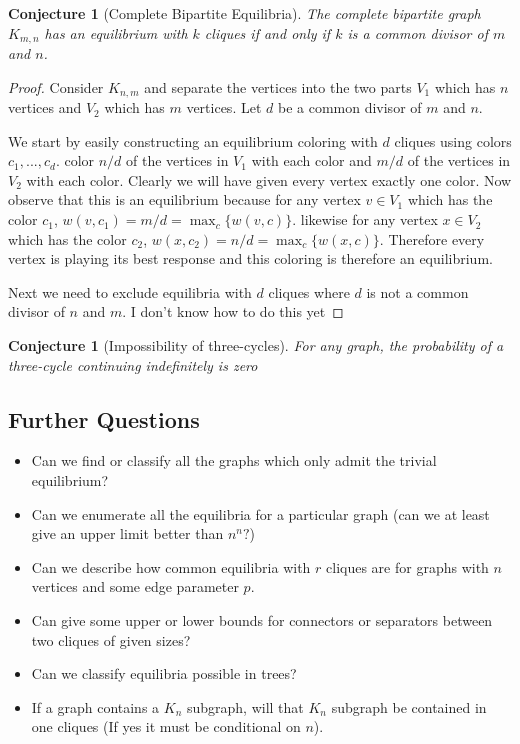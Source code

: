 \documentclass[]{article}
\newtheorem{conjecture}[theorem]{Conjecture}
\begin{document}
\begin{conjecture}[Complete Bipartite Equilibria]
	The complete bipartite graph $K_{m,n}$ has an equilibrium with $k$ cliques if and only if $k$ is a common divisor of $m$ and $n$.  
\end{conjecture}
\begin{proof}
		Consider $K_{n,m}$ and separate the vertices into the two parts $V_1$ which has $n$ vertices and $V_2$ which has $m$ vertices. Let $d$ be a common divisor of $m$ and $n$. 
		
		We start by easily constructing an equilibrium coloring with $d$ cliques using colors $c_1,...,c_d$. color $n/d$ of the vertices in $V_1$ with each color and $m/d$ of the vertices in $V_2$ with each color. Clearly we will have given every vertex exactly one color. Now observe that this is an equilibrium because for any vertex $v\in V_1$ which has the color $c_1$, $w(v,c_1)=m/d=\max_c\{w(v,c)\}.$ likewise for any vertex $x\in V_2$ which has the color $c_2$, $w(x,c_2)=n/d=\max_c\{w(x,c)\}.$ Therefore every vertex is playing its best response and this coloring is therefore an equilibrium. 
		
		Next we need to exclude equilibria with $d$ cliques where $d$ is not a common divisor of $n$ and $m$. I don't know how to do this yet
\end{proof} 

\begin{conjecture}[Impossibility of three-cycles]
	For any graph, the probability of a three-cycle continuing indefinitely is zero
\end{conjecture}
\subsection{Further Questions}

\begin{itemize}
	\item Can we find or classify all the graphs which only admit the trivial equilibrium? 
	\item Can we enumerate all the equilibria for a particular graph (can we at least give an upper limit better than $n^n?$)
	\item Can we describe how common equilibria with $r$ cliques are for graphs with $n$ vertices and some edge parameter $p$. 
	\item Can give some upper or lower bounds for connectors or separators between two cliques of given sizes?
	\item Can we classify equilibria possible in trees?
	\item If a graph contains a $K_n$ subgraph, will that $K_n$ subgraph be contained in one cliques (If yes it must be conditional on $n$).
\end{itemize}
\end{document}
